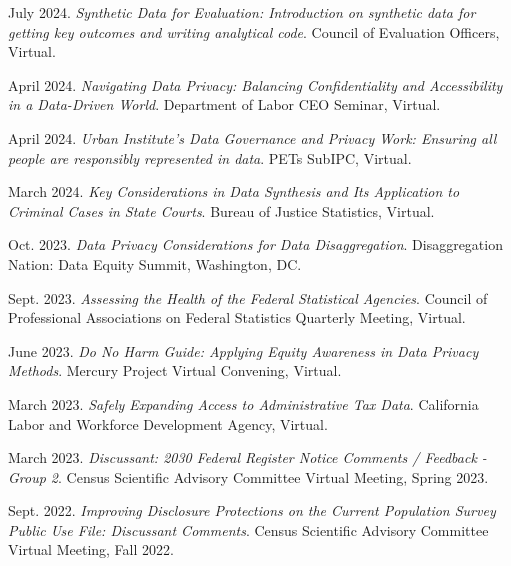 \begin{etaremune}[topsep=0pt, itemsep=4pt, partopsep=0pt, parsep=0pt]
    \item July 2024. \textit{Synthetic Data for Evaluation: Introduction on synthetic data for getting key outcomes and writing analytical code}. Council of Evaluation Officers, Virtual.
    
    \item April 2024. \textit{Navigating Data Privacy: Balancing Confidentiality and Accessibility in a Data-Driven World}. Department of Labor CEO Seminar, Virtual.
    
    \item April 2024. \textit{Urban Institute's Data Governance and Privacy Work: Ensuring all people are responsibly represented in data}. PETs SubIPC, Virtual.

    \item March 2024. \textit{Key Considerations in Data Synthesis and Its Application to Criminal Cases in State Courts}. Bureau of Justice Statistics, Virtual.
    
    \item Oct. 2023. \textit{Data Privacy Considerations for Data Disaggregation}. Disaggregation Nation: Data Equity Summit, Washington, DC.
    
    \item Sept. 2023. \textit{Assessing the Health of the Federal Statistical Agencies}. Council of Professional Associations on Federal Statistics Quarterly Meeting, Virtual.

    \item June 2023. \textit{Do No Harm Guide: Applying Equity Awareness in Data Privacy Methods}. Mercury Project Virtual Convening, Virtual.
    
    \item March 2023. \textit{Safely Expanding Access to Administrative Tax Data}. California Labor and Workforce Development Agency, Virtual.
    
    \item March 2023. \textit{Discussant: 2030 Federal Register Notice Comments / Feedback - Group 2}. Census Scientific Advisory Committee Virtual Meeting, Spring 2023.
    
    \item Sept. 2022. \textit{Improving Disclosure Protections on the Current Population Survey Public Use File: Discussant Comments}. Census Scientific Advisory Committee Virtual Meeting, Fall 2022.
    

\end{etaremune}
